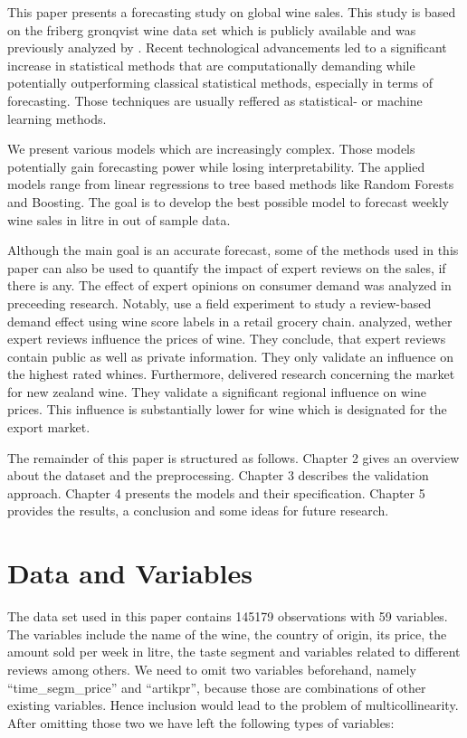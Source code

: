 \documentclass[11pt,]{article}
\begin{document}
This paper presents a forecasting study on global wine sales. This study
is based on the friberg gronqvist wine data set which is publicly
available and was previously analyzed by
\textcite[][p. 193f.]{Friberg2012}. Recent technological advancements
led to a significant increase in statistical methods that are
computationally demanding while potentially outperforming classical
statistical methods, especially in terms of forecasting. Those
techniques are usually reffered as statistical- or machine learning
methods.

We present various models which are increasingly complex. Those models
potentially gain forecasting power while losing interpretability. The
applied models range from linear regressions to tree based methods like
Random Forests and Boosting. The goal is to develop the best possible
model to forecast weekly wine sales in litre in out of sample data.

Although the main goal is an accurate forecast, some of the methods used
in this paper can also be used to quantify the impact of expert reviews
on the sales, if there is any. The effect of expert opinions on consumer
demand was analyzed in preceeding research. Notably,
\textcite[][]{Hilger2011} use a field experiment to study a review-based
demand effect using wine score labels in a retail grocery chain.
\textcite[][p. 293.]{Ashenfelter2013} analyzed, wether expert reviews
influence the prices of wine. They conclude, that expert reviews contain
public as well as private information. They only validate an influence
on the highest rated whines. Furthermore,
\textcite[][p. 182-183.]{Bicknell2012} delivered research concerning the
market for new zealand wine. They validate a significant regional
influence on wine prices. This influence is substantially lower for wine
which is designated for the export market.

The remainder of this paper is structured as follows. Chapter 2 gives an
overview about the dataset and the preprocessing. Chapter 3 describes
the validation approach. Chapter 4 presents the models and their
specification. Chapter 5 provides the results, a conclusion and some
ideas for future research.

\hypertarget{data-and-variables}{%
\section{Data and Variables}\label{data-and-variables}}

The data set used in this paper contains 145179 observations with 59
variables. The variables include the name of the wine, the country of
origin, its price, the amount sold per week in litre, the taste segment
and variables related to different reviews among others. We need to omit
two variables beforehand, namely \enquote{time\_segm\_price} and
\enquote{artikpr}, because those are combinations of other existing
variables. Hence inclusion would lead to the problem of
multicollinearity. After omitting those two we have left the following
types of variables:
\end{document}
